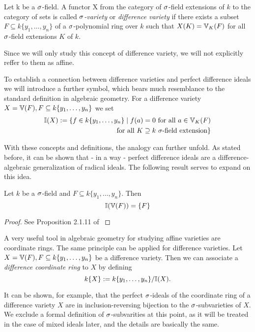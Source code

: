 \begin{defn}
Let k be a $\sigma$-field. A functor X from the category of $\sigma$-field extensions of $k$ to the category of sets is called \emph{$\sigma$-variety} or \emph{difference variety} 
 if there exists a subset $F \subseteq k\{y_1,\ldots,y_n\}$ of a $\sigma$-polynomial ring over $k$ such that $X(K) = \mathbb{V}_K(F)$ for all $\sigma$-field extensions $K$ of $k$.
\end{defn}

Since we will only study this concept of difference variety, we will not explicitly reffer to them as affine.

To establish a connection between difference varieties and perfect difference ideals we will introduce a further symbol, which bears much resemblance to the standard definition in algebraic geometry.
For a difference variety $X = \mathbb{V}(F), F \subseteq k\{y_1,\ldots,y_n\}$ we set 
\begin{align*} \mathbb{I}(X) := \{ f \in k\{y_1,\ldots,y_n \} \mid f(a) = 0 \text{ for all } a \in \mathbb{V}_K(F) \\ \text{ for all } K \supseteq k ~ \sigma \text{-field extension} \} \end{align*}

With these concepts and definitions, the analogy can further unfold. As stated before, it can be shown that - in a way - perfect difference ideals are a difference-algebraic generalization of radical ideals. The following result serves to expand on this idea.

\begin{prop}
Let $k$ be a $\sigma$-field and $F \subseteq k\{y_1,\ldots,y_n\}$. Then 
$$ \mathbb{I}(\mathbb{V}(F)) = \{F\}$$
\begin{proof}
See Proposition 2.1.11 of \cite{wibmer}
\end{proof}
\end{prop}

A very useful tool in algebraic geometry for studying affine varieties are coordinate rings. The same principle can be applied for difference varieties. Let $X = \mathbb{V}(F), F \subseteq k\{y_1,\ldots,y_n\}$  be a difference variety.
Then we can associate a \emph{difference coordinate ring}  to $X$ by 
defining $$ k\{X\} := k\{y_1,\ldots,y_n\}/\mathbb{I}(X).$$


It can be shown, for example, that the perfect $\sigma$-ideals of the coordinate ring of a difference variety $X$
are in inclusion-reversing bijection to the $\sigma$-subvarieties of $X$. We exclude a formal definition of $\sigma$-subvarities at this point, as it will be treated in the case of mixed ideals later, and the details are basically the same.


